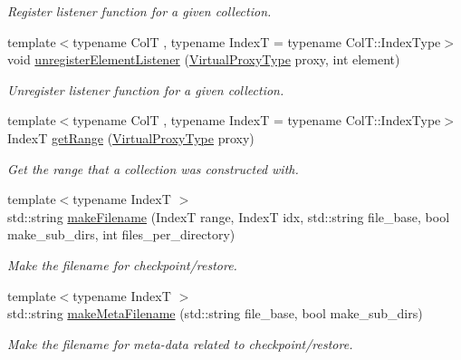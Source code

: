 \begin{DoxyCompactItemize}
\begin{DoxyCompactList}\small\item\em Register listener function for a given collection. \end{DoxyCompactList}\item 
{\footnotesize template$<$typename ColT , typename IndexT  = typename Col\+T\+::\+Index\+Type$>$ }\\void \hyperlink{structvt_1_1vrt_1_1collection_1_1_collection_manager_aecfd5c34b6d0b6781d3bb089ba1ae547}{unregister\+Element\+Listener} (\hyperlink{namespacevt_a1b417dd5d684f045bb58a0ede70045ac}{Virtual\+Proxy\+Type} proxy, int element)
\begin{DoxyCompactList}\small\item\em Unregister listener function for a given collection. \end{DoxyCompactList}\item 
{\footnotesize template$<$typename ColT , typename IndexT  = typename Col\+T\+::\+Index\+Type$>$ }\\IndexT \hyperlink{structvt_1_1vrt_1_1collection_1_1_collection_manager_a9259954aca1df3a68ad1d0a730687612}{get\+Range} (\hyperlink{namespacevt_a1b417dd5d684f045bb58a0ede70045ac}{Virtual\+Proxy\+Type} proxy)
\begin{DoxyCompactList}\small\item\em Get the range that a collection was constructed with. \end{DoxyCompactList}\item 
{\footnotesize template$<$typename IndexT $>$ }\\std\+::string \hyperlink{structvt_1_1vrt_1_1collection_1_1_collection_manager_ae8d3db4274a1239fa0097dae11e93bb9}{make\+Filename} (IndexT range, IndexT idx, std\+::string file\+\_\+base, bool make\+\_\+sub\+\_\+dirs, int files\+\_\+per\+\_\+directory)
\begin{DoxyCompactList}\small\item\em Make the filename for checkpoint/restore. \end{DoxyCompactList}\item 
{\footnotesize template$<$typename IndexT $>$ }\\std\+::string \hyperlink{structvt_1_1vrt_1_1collection_1_1_collection_manager_abe41e7e9c9dec081a79b222b4c5dc199}{make\+Meta\+Filename} (std\+::string file\+\_\+base, bool make\+\_\+sub\+\_\+dirs)
\begin{DoxyCompactList}\small\item\em Make the filename for meta-\/data related to checkpoint/restore. \end{DoxyCompactList}\item 

\end{DoxyCompactItemize}
